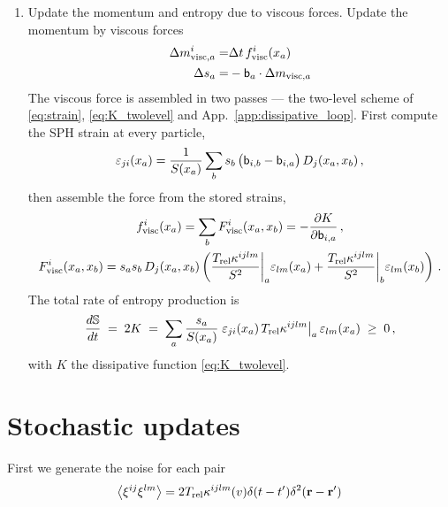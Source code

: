 \documentclass[12pt,aps,preprint,nofootinbib,noshowkeys,noshowpacs,longbibliography,superscriptaddress,tightenlines]{revtex4-2}
\def\Sbb{{\mathbb S}}
\def\bbeta{{\sf b}}
\def\F{{\mathcal F}}
\def\llangle{\left\langle}
\def\rrangle{\right\rangle}
\def\app#1{App.~\ref{#1}}
\def\st{\begin{equation}}
\def\stp{\end{equation}}
\begin{document}
\begin{enumerate}
The ideal equations are Hamilton's. Spefically we do the following:
  Update the positions
    \st
    \Delta x^i_a = \Delta t \, \delta^{ik }\dot x_{k, a}
    \stp
    and then update the momentum due to the ideal terms 
    \begin{multline}
\Delta m_{a}^i =  -\Delta t \sum_{b} \big[ (v/S)_j(x_a) s_a m_b^j + (v/S)_j(x_b) s_b m_a^j  \\
    -  (\F/S)(x_a)s_a s_b - (\F/S)(x_b) s_b s_a \big] \delta^{ik }  D_k (x_a, x_b) \, . 
\end{multline}
\item Update the momentum and entropy due to viscous forces. Update the momentum by viscous forces 
    \begin{align}
      \Delta m^i_{{\rm visc}, a} =& \Delta t  \, f^i_{\rm visc}(x_a) \\
      \Delta s_{a} =& -\bbeta_a  \cdot \Delta m_{{\rm visc}, a}
   \end{align}
   The viscous force is assembled in two passes --- the two-level scheme of
   \eqref{eq:strain}, \eqref{eq:K_twolevel} and \app{app:dissipative_loop}.
   First compute the SPH strain at every particle,
   \st
   \varepsilon_{ji}(x_a) = \frac{1}{S(x_a)} \sum_b s_b\,
      \big(\bbeta_{i,b}-\bbeta_{i,a}\big)\, D_j(x_a,x_b) \,,
   \stp
   then assemble the force from the stored strains,
   \begin{gather}
   f^i_{\rm visc}(x_a) = \sum_{b} F^i_{\rm visc}(x_a, x_b) = - \frac{\partial K}{\partial \bbeta_{i, a}} \, ,  \\
   F_{\rm visc}^i(x_a, x_b) =
   s_a s_b\, D_j(x_a, x_b) \left(
      \frac{T_{\rm rel} \kappa^{ijlm}}{S^2}\bigg|_a \varepsilon_{lm}(x_a)
      + \frac{T_{\rm rel} \kappa^{ijlm}}{S^2}\bigg|_b \varepsilon_{lm}(x_b)
      \right) \,.
   \end{gather}
   The total rate of entropy production is
   \st
   \frac{d\Sbb}{dt} \;=\; 2K \;=\; \sum_a \frac{s_a}{S(x_a)}\;
      \varepsilon_{ji}(x_a)\, T_{\rm rel}\kappa^{ijlm}\big|_a\,
      \varepsilon_{lm}(x_a) \;\ge\; 0\,,
   \stp
   with $K$ the dissipative function \eqref{eq:K_twolevel}.


    \end{enumerate}
\section{\bf Stochastic updates} 

First we  generate the noise for each pair 
\begin{align}
    \llangle \xi^{ij} \xi^{lm}  \rrangle = 2 T_{\rm rel} \kappa^{ijlm}(v) \delta(t-t') \delta^2(\mathbf{r}-\mathbf{r}')
\end{align}
\end{document}
